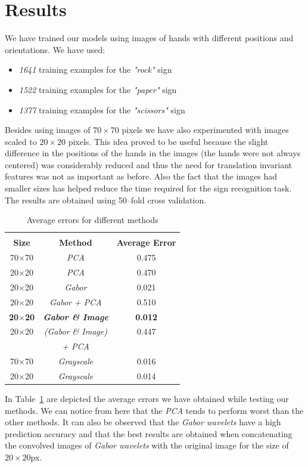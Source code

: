 \documentclass[a4paper, 11pt, twocolumn]{article}
\begin{document}
    \section{Results}
	\label{sec:results}
		We have trained our models using images of hands with different positions and orientations. We have used:
		\begin{itemize}
		\item \emph{1641} training examples for the \emph{"rock"} sign 
		\item \emph{1522} training examples for the \emph{"paper"} sign
		\item \emph{1377} training examples for the \emph{"scissors"} sign
		\end{itemize}
		Besides using images of $70\times 70$ pixels we have also experimented with images scaled to $20 \times 20$ pixels. This idea proved to be useful because the slight difference in the positions of the hands in the images (the hands were not always centered) was considerably reduced and thus the need for translation invariant features was not as important as before. Also the fact that the images had smaller sizes has helped reduce the time required for the sign recognition task.\\     
		\hspace*{10px}The results are obtained using 50--fold cross validation.\\
		\begin{table}[!hbtp]
		\begin{tabular}{| c | c | c |}
			\hline\hline
			& & \\
			\textbf{Size} & \textbf{Method} & \textbf{Average Error}\\[5px] 
			\hline\hline
			  70$\times$70 & \emph{PCA} & 0.475\\
			\hline
			  20$\times$20 & \emph{PCA} & 0.470\\
			\hline
			  20$\times$20 & \emph{Gabor} & 0.021\\
			\hline
			  20$\times$20 & \emph{Gabor + PCA} & 0.510\\
			\hline
			  \textbf{20$\times$20} & \textbf{\emph{Gabor \& Image}} & \textbf{0.012}\\
		 	\hline
			  20$\times$20 & \emph{(Gabor \& Image)} & 0.447\\
		               & \emph {+ PCA}  &     \\ 			
			\hline
			  70$\times$70 & \emph{Grayscale} & 0.016\\
			\hline
			  20$\times$20 & \emph{Grayscale} & 0.014\\
			\hline
		\end{tabular}
		\caption{Average errors for different methods}
		\label{tab:res}
		\end{table}
		\hspace*{10px}In Table~\ref{tab:res} are depicted the average errors we have obtained while testing our methods. We can notice from here that the \emph{PCA} tends to perform worst than the other methods. It can also be observed that the \emph{Gabor wavelets} have a high prediction accuracy and that the best results are obtained when concatenating the convolved images of \emph{Gabor wavelets} with the original image for the size of \emph{$20\times20$}px.  
\end{document}
